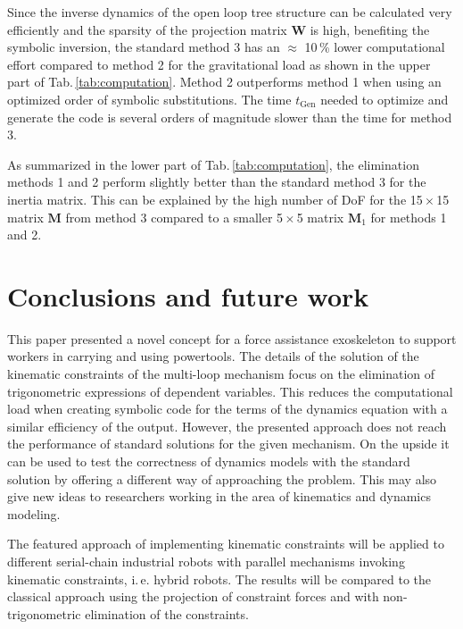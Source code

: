 \documentclass{svproc}
\newcommand{\bm}[1]{\boldsymbol{#1}}
\begin{document}
Since the inverse dynamics of the open loop tree structure can be calculated very efficiently and the sparsity of the projection matrix $\bm{W}$ is high, benefiting the symbolic inversion, the standard method 3 has an $\approx$ 10\,\% lower computational effort compared to method 2 for the gravitational load as shown in the upper part of Tab.\,\ref{tab:computation}.
Method 2 outperforms method 1 when using an optimized order of symbolic substitutions.
The time $t_{\mathrm{Gen}}$ needed to optimize and generate the code is several orders of magnitude slower than the time for method 3.

As summarized in the lower part of Tab.\,\ref{tab:computation}, the elimination methods 1 and 2 perform slightly better than the standard method 3 for the inertia matrix.
This can be explained by the high number of DoF for the 15\,$\times$\,15 matrix $\bm{M}$ from method 3 compared to a smaller 5\,$\times$\,5 matrix $\bm{M}_1$ for methods 1 and 2.

\section{Conclusions and future work}
\label{sec:conclusion}

This paper presented a novel concept for a force assistance exoskeleton to support workers in carrying and using powertools.
The details of the solution of the kinematic constraints of the multi-loop mechanism focus on the elimination of trigonometric expressions of dependent variables.
This reduces the computational load when creating symbolic code for the terms of the dynamics equation with a similar efficiency of the output.
However, the presented approach does not reach the performance of standard solutions for the given mechanism.
On the upside it can be used to test the correctness of dynamics models with the standard solution by offering a different way of approaching the problem.
This may also give new ideas to researchers working in the area of kinematics and dynamics modeling.

The featured approach of implementing kinematic constraints will be applied to different serial-chain industrial robots with parallel mechanisms invoking kinematic constraints, i.\,e. hybrid robots. 
The results will be compared to the classical approach using the projection of constraint forces and with non-trigonometric elimination of the constraints.
\end{document}
